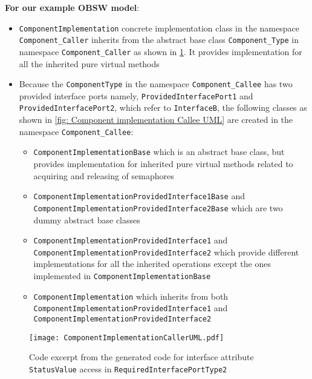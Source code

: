 \textbf{For our example OBSW model}:
\begin{itemize}
\item \texttt{Component\allowbreak Implementation} concrete implementation class in the namespace \texttt{Component\_Caller} inherits from the abstract base class \texttt{Component\_Type} in namespace \texttt{Component\allowbreak\_Caller} as shown in \cref{fig: Component implementation Caller UML}. It provides implementation for all the inherited pure virtual methods
\item Because the \texttt{ComponentType} in the namespace \texttt{Component\_Callee} has two provided interface ports namely, \texttt{Provided\allowbreak Interface\allowbreak Port1} and \texttt{Provided\allowbreak Interface\allowbreak Port2}, which refer to \texttt{InterfaceB}, the following classes as shown in \cref{fig: Component implementation Callee UML} are created in the namespace \texttt{Component\_Callee}:
\begin{itemize}
\item \texttt{ComponentImplementation\allowbreak Base} which is an abstract base class, but provides implementation for inherited pure virtual methods related to acquiring and releasing of semaphores
\item \texttt{Component\allowbreak Implementation\allowbreak Provided\allowbreak Interface1\allowbreak Base} and \texttt{Component\allowbreak Implementation\allowbreak Provided\allowbreak Interface2\allowbreak Base} which are two dummy abstract base classes
\item \texttt{Component\allowbreak Implementation\allowbreak Provided\allowbreak Interface1} and \texttt{Component\allowbreak Implementation\allowbreak Provided\allowbreak Interface2} which provide different implementations for all the inherited operations except the ones implemented in \texttt{Component\allowbreak Implementation\allowbreak Base}
\item \texttt{Component\allowbreak Implementation} which inherits from both \texttt{Component\allowbreak Implementation\allowbreak Provided\allowbreak Interface1} and \texttt{Component\allowbreak Implementation\allowbreak Provided\allowbreak Interface2}
\end{itemize}   
\end{itemize}

\begin{figure}[h]
	\centering
	\texttt{[image: ComponentImplementationCallerUML.pdf]}
	\caption{Code excerpt from the generated code for interface attribute \texttt{StatusValue} access in \texttt{Required\allowbreak InterfacePort\allowbreak Type2}}
	\label{fig: Component implementation Caller UML}
\end{figure} 

